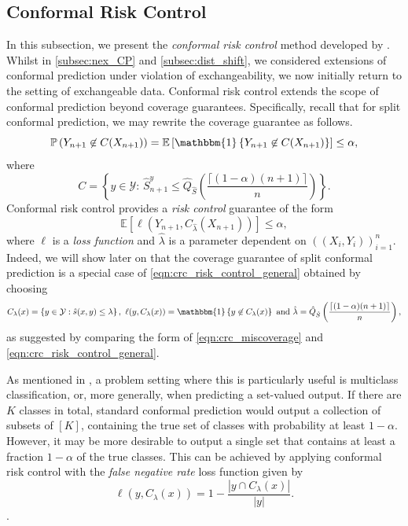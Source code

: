 \documentclass[11pt, titlepage]{article} %
\newcommand{\R}{\mathrm}
\newcommand{\Prob}[1]{\mathbb{P}\left( #1 \right)}
\newcommand{\Exp}[3]{\mathbb{E}\left#2 #1 \right#3}
\newcommand{\Ind}[1]{\mathbbm{1}\left\{ #1 \right\}}
\numberwithin{equation}{section}
\theoremstyle{definition}
\numberwithin{theorem}{section}
\numberwithin{lemma}{section}
\numberwithin{corollary}{section}
\numberwithin{proposition}{section}
\numberwithin{definition}{section}
\numberwithin{remark}{section}
\begin{document}
\subsection{Conformal Risk Control}
\label{subsec:crc}

In this subsection, we present the \textit{conformal risk control} method developed by \cite{angelopoulos2024riskcontrol}. Whilst in \cref{subsec:nex_CP} and \cref{subsec:dist_shift}, we considered extensions of conformal prediction under violation of exchangeability, we now initially return to the setting of exchangeable data. Conformal risk control extends the scope of conformal prediction beyond coverage guarantees. Specifically, recall that for split conformal prediction, we may rewrite the coverage guarantee as follows. \begin{equation}
    \Prob{Y_{n+1} \not \in C(X_{n+1})} = \Exp{\Ind{Y_{n+1} \not \in C(X_{n+1})}}{[}{]} \leq \alpha,
\label{eqn:crc_miscoverage}
\end{equation} where \[C = \left\{y \in \mathcal{Y}: \, \hat{S}_{n+1}^y \leq \hat{Q}_{\hat{S}}\left( \frac{\lceil (1-\alpha)(n+1) \rceil}{n} \right) \right\}.\] Conformal risk control provides a \textit{risk control} guarantee of the form \begin{equation}
    \Exp{\ell(Y_{n+1}, C_{\hat{\lambda}}(X_{n+1}))}{[}{]} \leq \alpha,
\label{eqn:crc_risk_control_general}
\end{equation} where \(\ell\) is a \textit{loss function} and \(\hat{\lambda}\) is a parameter dependent on \(((X_i, Y_i))_{i=1}^n\). Indeed, we will show later on that the coverage guarantee of split conformal prediction is a special case of \eqref{eqn:crc_risk_control_general} obtained by choosing \begin{equation}
    C_{\lambda}(x) = \left\{ y \in \mathcal{Y}: \hat{s}(x,y) \leq \lambda \right\}, \  \ell(y, C_\lambda(x)) = \Ind{y \not \in C_{\lambda}(x)} \  \R{and} \  \hat{\lambda} = \hat{Q}_{\hat{S}}\left( \frac{\lceil (1-\alpha)(n+1) \rceil}{n} \right), 
\label{eqn:crc_special_case} 
\end{equation} as suggested by comparing the form of \eqref{eqn:crc_miscoverage} and \eqref{eqn:crc_risk_control_general}. \vskip5pt

\noindent
As mentioned in \cite{angelopoulos2024riskcontrol}, a problem setting where this is particularly useful is multiclass classification, or, more generally, when predicting a set-valued output. If there are \(K\) classes in total, standard conformal prediction would output a collection of subsets of \([K]\), containing the true set of classes with probability at least \(1-\alpha\). However, it may be more desirable to output a single set that contains at least a fraction \(1-\alpha\) of the true classes. This can be achieved by applying conformal risk control with the \textit{false negative rate} loss function given by 
\[
    \ell(y, C_\lambda (x)) = 1 - \frac{|y \cap C_\lambda (x)|}{|y|}.
\].
\end{document}
